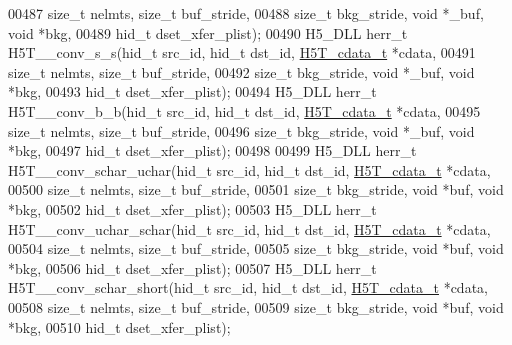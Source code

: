 \begin{DoxyCode}
00487                 \textcolor{keywordtype}{size\_t} nelmts, \textcolor{keywordtype}{size\_t} buf\_stride,
00488                             \textcolor{keywordtype}{size\_t} bkg\_stride, \textcolor{keywordtype}{void} *\_buf, \textcolor{keywordtype}{void} *bkg,
00489                             hid\_t dset\_xfer\_plist);
00490 H5\_DLL herr\_t H5T\_\_conv\_s\_s(hid\_t src\_id, hid\_t dst\_id, \hyperlink{struct_h5_t__cdata__t}{H5T\_cdata\_t} *cdata,
00491                 \textcolor{keywordtype}{size\_t} nelmts, \textcolor{keywordtype}{size\_t} buf\_stride,
00492                             \textcolor{keywordtype}{size\_t} bkg\_stride, \textcolor{keywordtype}{void} *\_buf, \textcolor{keywordtype}{void} *bkg,
00493                             hid\_t dset\_xfer\_plist);
00494 H5\_DLL herr\_t H5T\_\_conv\_b\_b(hid\_t src\_id, hid\_t dst\_id, \hyperlink{struct_h5_t__cdata__t}{H5T\_cdata\_t} *cdata,
00495                 \textcolor{keywordtype}{size\_t} nelmts, \textcolor{keywordtype}{size\_t} buf\_stride,
00496                             \textcolor{keywordtype}{size\_t} bkg\_stride, \textcolor{keywordtype}{void} *\_buf, \textcolor{keywordtype}{void} *bkg,
00497                             hid\_t dset\_xfer\_plist);
00498 
00499 H5\_DLL herr\_t H5T\_\_conv\_schar\_uchar(hid\_t src\_id, hid\_t dst\_id, \hyperlink{struct_h5_t__cdata__t}{H5T\_cdata\_t} *cdata,
00500                             \textcolor{keywordtype}{size\_t} nelmts, \textcolor{keywordtype}{size\_t} buf\_stride,
00501                             \textcolor{keywordtype}{size\_t} bkg\_stride, \textcolor{keywordtype}{void} *buf, \textcolor{keywordtype}{void} *bkg,
00502                             hid\_t dset\_xfer\_plist);
00503 H5\_DLL herr\_t H5T\_\_conv\_uchar\_schar(hid\_t src\_id, hid\_t dst\_id, \hyperlink{struct_h5_t__cdata__t}{H5T\_cdata\_t} *cdata,
00504                             \textcolor{keywordtype}{size\_t} nelmts, \textcolor{keywordtype}{size\_t} buf\_stride,
00505                             \textcolor{keywordtype}{size\_t} bkg\_stride, \textcolor{keywordtype}{void} *buf, \textcolor{keywordtype}{void} *bkg,
00506                             hid\_t dset\_xfer\_plist);
00507 H5\_DLL herr\_t H5T\_\_conv\_schar\_short(hid\_t src\_id, hid\_t dst\_id, \hyperlink{struct_h5_t__cdata__t}{H5T\_cdata\_t} *cdata,
00508                             \textcolor{keywordtype}{size\_t} nelmts, \textcolor{keywordtype}{size\_t} buf\_stride,
00509                             \textcolor{keywordtype}{size\_t} bkg\_stride, \textcolor{keywordtype}{void} *buf, \textcolor{keywordtype}{void} *bkg,
00510                             hid\_t dset\_xfer\_plist);

\end{DoxyCode}
